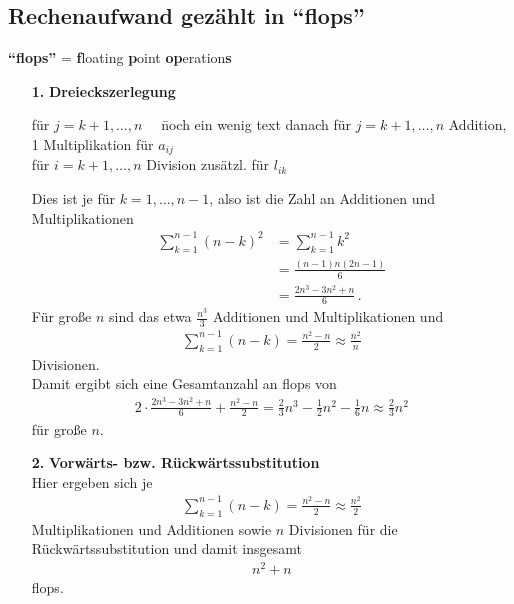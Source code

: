 \documentclass[ngerman,fontsize=11pt, paper=a4, parskip=half, titlepage=true, toc=bib]{scrbook}
\begin{document}
\subsection{Rechenaufwand gezählt in \enquote{flops}} 
\textbf{\enquote{flops} }= \textbf{f}loating \textbf{p}oint \textbf{op}eration\textbf{s} \\
\begin{enumerate}
	\item[\textbf{1.}] \textbf{Dreieckszerlegung} 
			\begin{tabbing}
				für $j=k+1, \dots, n\quad$ \= noch ein wenig text danach \kill
				für $j=k+1, \dots, n$  Addition, 1 Multiplikation für $a_{ij}$ \\
				für $i=k+1, \dots, n$  Division zusätzl. für $ l_{ik}$
			\end{tabbing}
			Dies ist je für $k=1, \dots, n-1$, also ist die Zahl an Additionen und Multiplikationen
			\begin{align*}
				\sum_{k=1}^{n-1}(n-k)^2 &= \sum_{k=1}^{n-1}k^2 \\
				 											&= \frac{(n-1)n(2n-1)}{6} \\
				 									        &= \frac{2n^3-3n^2+n}{6}\, .
			\end{align*}
			Für große $n$ sind das etwa $\frac{n^3}{3}$ Additionen und Multiplikationen und
			\begin{gather*}
				\sum_{k=1}^{n-1} (n-k) = \frac{n^2-n}{2} \approx \frac{n^2}{n}
			\end{gather*}
			Divisionen. \\
			Damit ergibt sich eine Gesamtanzahl an flops von
			\begin{gather*}
				2\cdot\frac{2n^3-3n^2+n}{6} + \frac{n^2-n}{2} 
					= \frac{2}{3} n^3 - \frac{1}{2}n^2 - \frac{1}{6} n
					 \approx \frac{2}{3}n^2
			\end{gather*}
			für große $n$.
			
	\item[\textbf{2.}] \textbf{Vorwärts- bzw. Rückwärtssubstitution}  \\
			Hier ergeben sich je
			\begin{gather*}
				\sum_{k=1}^{n-1} (n-k) = \frac{n^2-n}{2} \approx \frac{n^2}{2}
			\end{gather*}
			Multiplikationen und Additionen sowie 
			$n$ Divisionen für die Rückwärtssubstitution und damit insgesamt \begin{gather*}n^2+n\end{gather*} flops.	
\end{enumerate}
\end{document}
